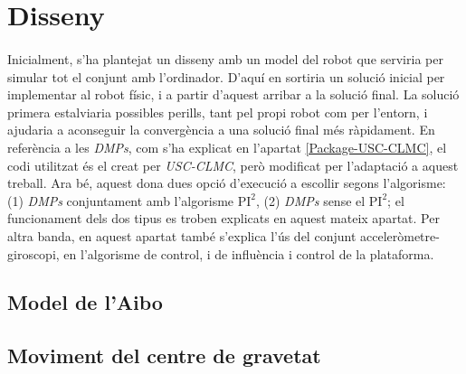 \documentclass[12pt,a4paper,final,twoside]{article}
\begin{document}
\newpage
\section{Disseny}

\paragraph{}Inicialment, s'ha plantejat un disseny amb un model del robot que serviria per simular tot el conjunt amb l'ordinador. D'aquí en sortiria un solució inicial per implementar al robot físic, i a partir d'aquest arribar a la solució final. La solució primera estalviaria possibles perills, tant pel propi robot com per l'entorn, i ajudaria a aconseguir la convergència a una solució final més ràpidament. En referència a les \textit{DMPs}, com s'ha explicat en l'apartat \ref{Package-USC-CLMC}, el codi utilitzat és el creat per \textit{USC-CLMC}, però modificat per l'adaptació a aquest treball. Ara bé, aquest dona dues opció d'execució a escollir segons l'algorisme: (1) \textit{DMPs} conjuntament amb l'algorisme $\mathrm{PI^2}$, (2) \textit{DMPs} sense el $\mathrm{PI^2}$; el funcionament dels dos tipus es troben explicats en aquest mateix apartat. Per altra banda, en aquest apartat també s'explica l'ús del conjunt acceleròmetre-giroscopi, en l'algorisme de control, i de influència i control de la plataforma.




\subsection{Model de l'Aibo}


\subsection{Moviment del centre de gravetat}
\end{document}
